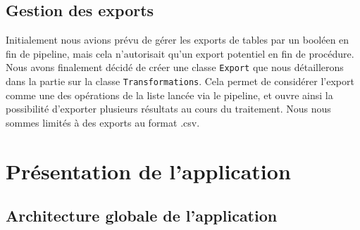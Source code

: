 \documentclass[11pt]{article}
\begin{document}
\subsection{Gestion des exports}
Initialement nous avions prévu de gérer les exports de tables par un booléen en fin de pipeline, mais cela n'autorisait qu'un export potentiel en fin de procédure. Nous avons finalement décidé de créer une classe \texttt{Export} que nous détaillerons dans la partie sur la classe \texttt{Transformations}. Cela permet de considérer l'export comme une des opérations de la liste lancée via le pipeline, et ouvre ainsi la possibilité d'exporter plusieurs résultats au cours du traitement. Nous nous sommes limités à des exports au format .csv.  


\newpage

\section{Présentation de l'application}

\subsection{Architecture globale de l'application}
\end{document}
